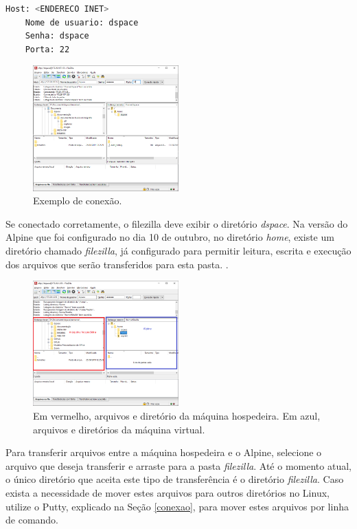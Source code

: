 \begin{lstlisting}[language=bash, label=lst2, caption=Campos do Filezilla para serem alterados]
    Host: <ENDERECO INET>
    Nome de usuario: dspace
    Senha: dspace
    Porta: 22
\end{lstlisting}

\begin{figure}[h]
    \centering
    \includegraphics[width=0.5\textwidth]{images/filezilla1.png}
    \caption{Exemplo de conexão.}
    \label{fig1}
\end{figure}

Se conectado corretamente, o filezilla deve exibir o diretório \textit{dspace}. Na versão do Alpine que foi configurado no dia 10 de outubro, no diretório \textit{home}, existe um diretório chamado \textit{filezilla}, já configurado para permitir leitura, escrita e execução dos arquivos que serão transferidos para esta pasta. .

\begin{figure}[H]
    \centering
    \includegraphics[width=0.5\textwidth]{images/filezilla2.png}
    \caption{Em vermelho, arquivos e diretório da máquina hospedeira. Em azul, arquivos e diretórios da máquina virtual.}
    \label{fig1}
\end{figure}

Para transferir arquivos entre a máquina hospedeira e o Alpine, selecione o arquivo que deseja transferir e arraste para a pasta \textit{filezilla}. Até o momento atual, o único diretório que aceita este tipo de transferência é o diretório \textit{filezilla}. Caso exista a necessidade de mover estes arquivos para outros diretórios no Linux, utilize o Putty, explicado na Seção \ref{conexao}, para mover estes arquivos por linha de comando.

